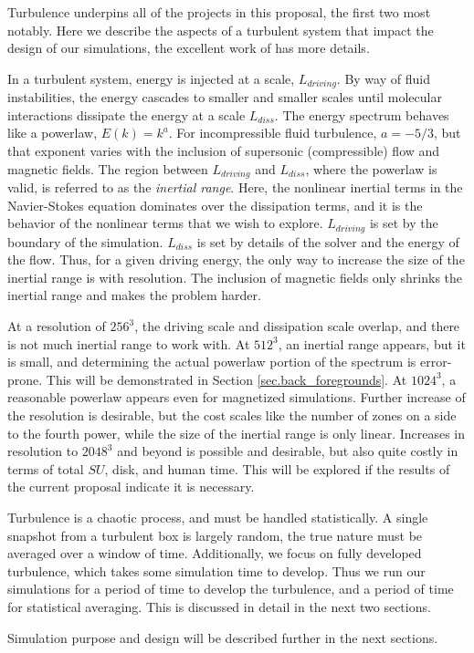 Turbulence underpins all of the projects in this proposal, the first two most
notably.  Here we describe the aspects of a turbulent system that impact the
design of our simulations, the excellent work of \citet{Frisch95} has more
details.

In a turbulent system, energy is injected at a scale, $L_{driving}$.  By way of
fluid instabilities, the energy cascades to smaller and smaller scales until
molecular interactions dissipate the energy at a scale $L_{diss}$.  The energy
spectrum 
behaves like a powerlaw, $E(k)=k^{a}$.  For incompressible fluid turbulence,
$a=-5/3$, but that exponent varies with the inclusion of supersonic
(compressible) flow and magnetic fields.  The region between
$L_{driving}$ and $L_{diss}$, where the powerlaw is valid, is referred to as
the \emph{inertial range}.  Here, the nonlinear inertial terms in the
Navier-Stokes equation dominates over the dissipation terms, and it is the
behavior of the nonlinear terms that we wish to explore.  $L_{driving}$ is set
by the boundary of the simulation. $L_{diss}$ is set by details of the
solver and the energy of the flow.  Thus, for a given driving energy, the only
way to increase the size of the inertial range is with resolution.  The
inclusion of magnetic fields only shrinks the inertial range and makes the
problem harder.

At a resolution of $256^3$, the driving scale and dissipation scale overlap, and
there is not much inertial range to work with.  At $512^3$, an inertial range
appears, but it is small, and determining the actual powerlaw portion of the
spectrum is error-prone.  This will be demonstrated in Section
\ref{sec.back_foregrounds}.  At $1024^3$, a reasonable powerlaw appears even for
magnetized simulations.  Further increase of the resolution is desirable, but
the cost scales like the number of zones on a side to the fourth power, while
the size of the inertial range is only linear.  Increases in resolution to
$2048^3$ and beyond is possible and desirable, but also quite costly in terms of
total $SU$, disk, and human time.  This will be explored if the results of the
current proposal indicate it is necessary.  

Turbulence is a chaotic process, and must be handled statistically.  A single
snapshot from a turbulent box is largely random, the true nature must be
averaged over a window of time.  Additionally, we focus on fully developed
turbulence, which takes some simulation time to develop. Thus we run our
simulations for a period of time to develop the turbulence, and a period of time
for statistical averaging.  This is discussed in detail in the next two
sections.


Simulation purpose and design will be described further in the next
sections.
